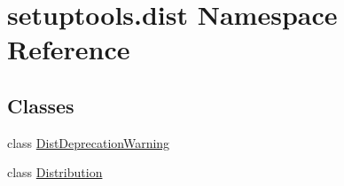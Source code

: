 \hypertarget{namespacesetuptools_1_1dist}{}\section{setuptools.\+dist Namespace Reference}
\label{namespacesetuptools_1_1dist}
\subsection*{Classes}
\begin{DoxyCompactItemize}
\item 
class \hyperlink{classsetuptools_1_1dist_1_1DistDeprecationWarning}{Dist\+Deprecation\+Warning}
\item 
class \hyperlink{classsetuptools_1_1dist_1_1Distribution}{Distribution}
\end{DoxyCompactItemize}

